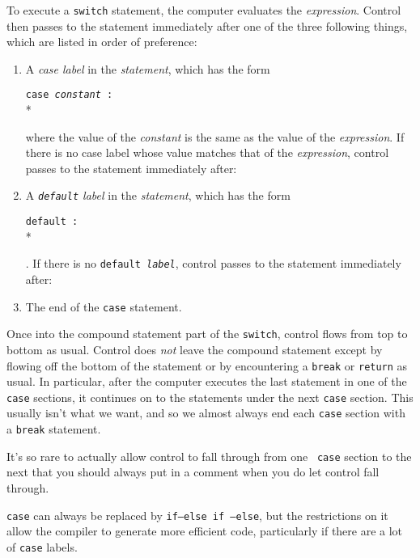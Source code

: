 To execute a {\tt switch} statement, the computer evaluates the {\em
expression}\/.  Control then passes to the statement immediately after
one of the three following things, which are listed in order of
preference:
\begin{enumerate}
\item A {\em case label}\/ in the {\em statement}, which has the form 
\begin{flushleft}
{\tt case {\em constant} : } \\*
\end{flushleft}

\noindent where the value of the {\em constant}  is the same as the
value of the {\em expression}\/.  If there is no case label whose value
matches that of the {\em expression}, control passes to the statement
immediately after:

\item A {\em {\tt  default} label}\/ in the {\em statement}\/, which has
the form 
\begin{flushleft}
{\tt default : } \\*
\end{flushleft}

\noindent .  If there is no {\tt default \em label}\/, control passes to
the statement immediately after:

\item The end of the {\tt case} statement.  

\end{enumerate}

Once into the compound statement part of the {\tt switch}, control flows
from top to bottom as usual.  Control does {\em not}\/ leave the
compound statement except by flowing off the bottom of the statement or
by encountering a {\tt break} or {\tt return} as usual.  In particular,
after the computer executes the last statement in one of the {\tt case}
sections, it continues on to the statements under the next {\tt case}
section.  This usually isn't what we want, and so we almost always end
each {\tt case} section with a {\tt break} statement.  

It's so rare to actually allow control to fall through from one {\tt
case} section to the next that you should always put in a comment when
you do let control fall through.  

{\tt case} can always be replaced by {\tt if{\rm --}else if{\rm
--}else}, but the restrictions on it allow the compiler to generate more
efficient code, particularly if there are a lot of {\tt case} labels.  

